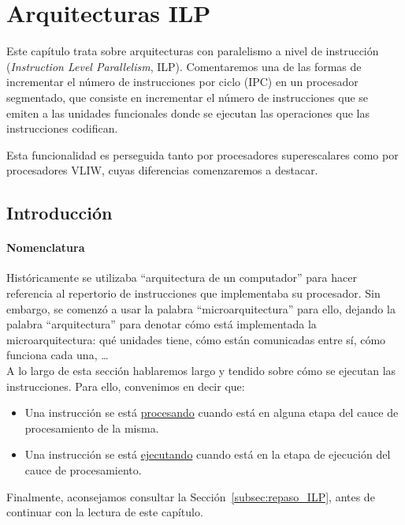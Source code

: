 \chapter{Arquitecturas ILP}
Este capítulo trata sobre arquitecturas con paralelismo a nivel de instrucción (\emph{Instruction Level Parallelism}, ILP). Comentaremos una de las formas de incrementar el número de instrucciones por ciclo (IPC) en un procesador segmentado, que consiste en incrementar el número de instrucciones que se emiten a las unidades funcionales donde se ejecutan las operaciones que las instrucciones codifican.

Esta funcionalidad es perseguida tanto por procesadores superescalares como por procesadores VLIW, cuyas diferencias comenzaremos a destacar.

\section{Introducción}

\subsubsection{Nomenclatura}
Históricamente se utilizaba ``arquitectura de un computador'' para hacer referencia al repertorio de instrucciones que implementaba su procesador. Sin embargo, se comenzó a usar la palabra ``microarquitectura'' para ello, dejando la palabra ``arquitectura'' para denotar cómo está implementada la microarquitectura: qué unidades tiene, cómo están comunicadas entre sí, cómo funciona cada una, \ldots\\

A lo largo de esta sección hablaremos largo y tendido sobre cómo se ejecutan las instrucciones. Para ello, convenimos en decir que:
\begin{itemize}
    \item Una instrucción se está \underline{procesando} cuando está en alguna etapa del cauce de procesamiento de la misma.
    \item Una instrucción se está \underline{ejecutando} cuando está en la etapa de ejecución del cauce de procesamiento.
\end{itemize}
Finalmente, aconsejamos consultar la Sección~\ref{subsec:repaso_ILP}, antes de continuar con la lectura de este capítulo.

